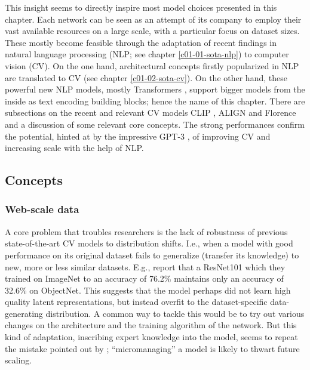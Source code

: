 \documentclass[
]{krantz}
\begin{document}
This insight seems to directly inspire most model choices presented in this chapter.
Each network can be seen as an attempt of its company to employ their vast available resources on a large scale, with a particular focus on dataset sizes.
These mostly become feasible through the adaptation of recent findings in natural language processing (NLP; see chapter \ref{c01-01-sota-nlp}) to computer vision (CV).
On the one hand, architectural concepts firstly popularized in NLP are translated to CV \citep[e.g., self-supervised learning or the Vision Transformer;][]{ImageT} (see chapter \ref{c01-02-sota-cv}).
On the other hand, these powerful new NLP models, mostly Transformers \citep{vaswani2017attention}, support bigger models from the inside as text encoding building blocks; hence the name of this chapter.
There are subsections on the recent and relevant CV models CLIP \citep{radford2021learning}, ALIGN \citep{jia2021scaling} and Florence \citep{yuan2021florence} and a discussion of some relevant core concepts.
The strong performances confirm the potential, hinted at by the impressive GPT-3 \citep{brown2020language}, of improving CV and increasing scale with the help of NLP.

\hypertarget{concepts}{%
\subsection{Concepts}\label{concepts}}

\hypertarget{webScaleData}{%
\subsubsection{Web-scale data}\label{webScaleData}}

A core problem that troubles researchers is the lack of robustness of previous state-of-the-art CV models to distribution shifts.
I.e., when a model with good performance on its original dataset fails to generalize (transfer its knowledge) to new, more or less similar datasets.
E.g., \citet{radford2021learning} report that a ResNet101 which they trained on ImageNet to an accuracy of 76.2\% maintains only an accuracy of 32.6\% on ObjectNet.
This suggests that the model perhaps did not learn high quality latent representations, but instead overfit to the dataset-specific data-generating distribution.
A common way to tackle this would be to try out various changes on the architecture and the training algorithm of the network.
But this kind of adaptation, inscribing expert knowledge into the model, seems to repeat the mistake pointed out by \citet{sutton2019bitterlesson}; ``micromanaging'' a model is likely to thwart future scaling.
\end{document}
